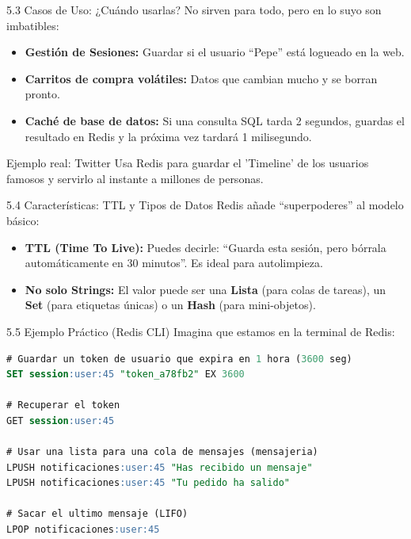 \begin{frame}{5.3 Casos de Uso: ¿Cuándo usarlas?}
    No sirven para todo, pero en lo suyo son imbatibles:
    \begin{itemize}
        \item \textbf{Gestión de Sesiones:} Guardar si el usuario ``Pepe'' está logueado en la web.
        \item \textbf{Carritos de compra volátiles:} Datos que cambian mucho y se borran pronto.
        \item \textbf{Caché de base de datos:} Si una consulta SQL tarda 2 segundos, guardas el resultado en Redis y la próxima vez tardará 1 milisegundo.
    \end{itemize}
    \begin{exampleblock}{Ejemplo real: Twitter}
        Usa Redis para guardar el 'Timeline' de los usuarios famosos y servirlo al instante a millones de personas.
    \end{exampleblock}
\end{frame}

\begin{frame}{5.4 Características: TTL y Tipos de Datos}
    Redis añade ``superpoderes'' al modelo básico:
    \begin{itemize}
        \item \textbf{TTL (Time To Live):} Puedes decirle: ``Guarda esta sesión, pero bórrala automáticamente en 30 minutos''. Es ideal para autolimpieza.
        \item \textbf{No solo Strings:} El valor puede ser una \textbf{Lista} (para colas de tareas), un \textbf{Set} (para etiquetas únicas) o un \textbf{Hash} (para mini-objetos).
    \end{itemize}
\end{frame}

\begin{frame}[fragile]{5.5 Ejemplo Práctico (Redis CLI)}
    Imagina que estamos en la terminal de Redis:
    \begin{lstlisting}[language=SQL]
# Guardar un token de usuario que expira en 1 hora (3600 seg)
SET session:user:45 "token_a78fb2" EX 3600

# Recuperar el token
GET session:user:45

# Usar una lista para una cola de mensajes (mensajeria)
LPUSH notificaciones:user:45 "Has recibido un mensaje"
LPUSH notificaciones:user:45 "Tu pedido ha salido"

# Sacar el ultimo mensaje (LIFO)
LPOP notificaciones:user:45
    \end{lstlisting}
\end{frame}
